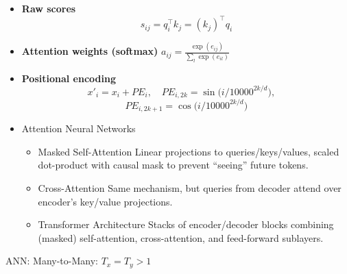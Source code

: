 \documentclass[8pt,twocolumn]{article}
\begin{document}
\begin{itemize}
    \setlength{\itemsep}{0pt}
    \setlength{\parskip}{0pt}
  \item \textbf{Raw scores}  
    \[
      s_{ij} = q_i^\top k_j = (k_j)^\top q_i
    \]  
  \item \textbf{Attention weights (softmax)}  
    $
      a_{ij} = \frac{\exp(e_{ij})}{\sum_{l}\exp(e_{il})}
    $  
  \item \textbf{Positional encoding}  
    \[
      x'_i = x_i + PE_i,
      \quad
      PE_{i,2k}   = \sin \bigl(i/10000^{2k/d}\bigr),
      \quad\]\[
      PE_{i,2k+1} = \cos \bigl(i/10000^{2k/d}\bigr)
    \]  
\end{itemize}
\begin{itemize}
    \setlength{\itemsep}{0pt}
    \setlength{\parskip}{0pt}
    \item Attention Neural Networks
    \begin{itemize}
        \setlength{\itemsep}{0pt}
        \setlength{\parskip}{0pt}
        \item Masked Self-Attention
        Linear projections to queries/keys/values, scaled dot-product with causal mask to prevent “seeing” future tokens.
        \item Cross-Attention
        Same mechanism, but queries from decoder attend over encoder’s key/value projections.
        \item Transformer Architecture
        Stacks of encoder/decoder blocks combining (masked) self-attention, cross-attention, and feed-forward sublayers.
    \end{itemize}
\end{itemize}
ANN: Many-to-Many: $T_x = T_y > 1$\\
\noindent{}
\end{document}
